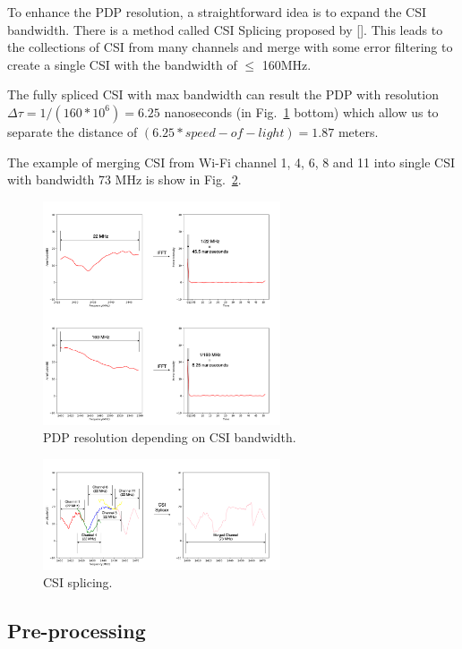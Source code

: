 \documentclass[conference]{IEEEtran}
\begin{document}
	To enhance the PDP resolution, a straightforward idea is to expand the CSI bandwidth. There is a method called CSI Splicing proposed by []. This leads to the collections of CSI from many channels and merge with some error filtering to create a single CSI with the bandwidth of $\le$ 160MHz. 
	
	
	The fully spliced CSI with max bandwidth can result the PDP with resolution $\Delta\tau=1/(160*10^6)=6.25$  nanoseconds (in Fig.~\ref{fig:CSISplicing01} bottom) which allow us to separate the distance of
	$(6.25*speed-of-light)= 1.87$ meters.
	
		The example of merging CSI from Wi-Fi channel 1, 4, 6, 8 and 11 into single CSI with bandwidth 73 MHz is show in Fig.~\ref{fig:CSISplicing02}.
	
	\begin{figure}[htbp]
		
		\centerline{\includegraphics[width=70mm,scale=0.5]{CSISplicing01.png}}
		\caption{PDP resolution depending on CSI bandwidth.}
		\label{fig:CSISplicing01}
	\end{figure}

\begin{figure}[htbp]
	
	\centerline{\includegraphics[width=70mm,scale=0.5]{CSISplicing03.png}}
	\caption{CSI splicing.}
	\label{fig:CSISplicing02}
\end{figure}
	
		\fi
	


	\subsection{Pre-processing}\label{Processing}
	
\end{document}
